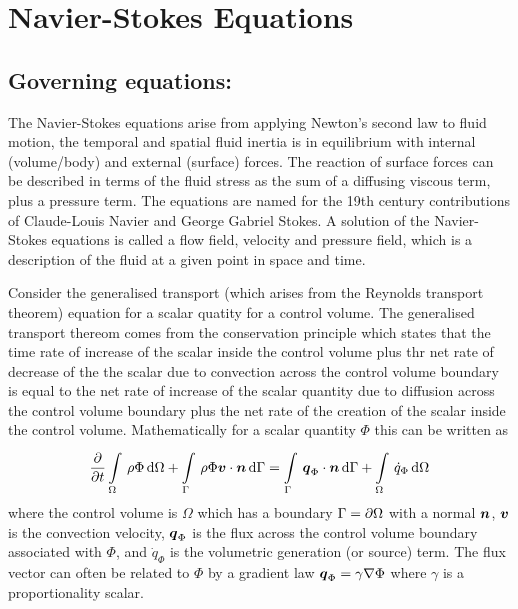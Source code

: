 \section{Navier-Stokes Equations}
\label{sec:NavierStokesEquations}

\subsection{Governing equations:}

The Navier-Stokes equations arise from applying Newton's second law to fluid
motion, \ie the temporal and spatial fluid inertia is in equilibrium with
internal (volume/body) and external (surface) forces. The reaction of surface
forces can be described in terms of the fluid stress as the sum of a diffusing
viscous term, plus a pressure term. The equations are named for the 19th
century contributions of Claude-Louis Navier and George Gabriel Stokes. A
solution of the Navier-Stokes equations is called a flow field, \ie velocity
and pressure field, which is a description of the fluid at a given point in
space and time.

Consider the generalised transport (which arises from the Reynolds transport
theorem) equation for a scalar quatity for a control volume. The generalised
transport thereom comes from the conservation principle which states that the
time rate of increase of the scalar inside the control volume plus thr net rate
of decrease of the the scalar due to convection across the control volume
boundary is equal to the net rate of increase of the scalar quantity due to
diffusion across the control volume boundary plus the net rate of the creation
of the scalar inside the control volume. Mathematically for a scalar quantity
$\Phi$ this can be written as
\begin{equation}
  \delby{}{t}\gint{\Omega}{}{\rho\Phi}{\Omega}+\gint{\Gamma}{}{\dotprod{\rho\Phi\vectr{v}}{\vectr{n}}}{\Gamma}=
  \gint{\Gamma}{}{\dotprod{\vectr{q}_{\Phi}}{\vectr{n}}}{\Gamma}+\gint{\Omega}{}{\dot{q}_{\Phi}}{\Omega}
  \label{eqn:NSEIntegralGenScalarTransport}
\end{equation}
where the control volume is $\Omega$ which has a boundary
$\Gamma= \partial{\Omega} $ with a normal $ \boldsymbol{n} $, $ \boldsymbol{v} $ is the
convection velocity, $ \boldsymbol{q} _{\Phi}$ is the flux across the control volume
boundary associated with $\Phi$, and $\dot{q}_{\Phi}$ is the volumetric
generation (or source) term. The flux vector can often be related to $\Phi$ by
a gradient law \ie $\vectr{q}_{\Phi}=\gamma\gradient{}{\Phi}$ where $\gamma$
is a proportionality scalar.

